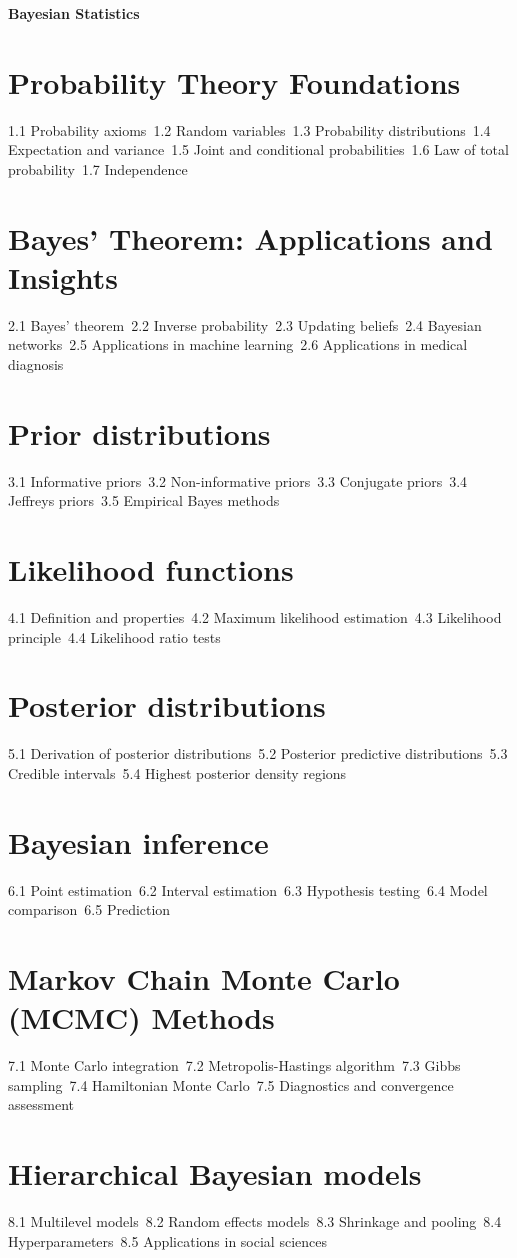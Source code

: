 {\LARGE \bf{Bayesian Statistics}}
\section{Probability Theory Foundations}
1.1 Probability axioms\
1.2 Random variables\
1.3 Probability distributions\
1.4 Expectation and variance\
1.5 Joint and conditional probabilities\
1.6 Law of total probability\
1.7 Independence\
\section{Bayes' Theorem: Applications and Insights}
2.1 Bayes' theorem\
2.2 Inverse probability\
2.3 Updating beliefs\
2.4 Bayesian networks\
2.5 Applications in machine learning\
2.6 Applications in medical diagnosis\
\section{Prior distributions}
3.1 Informative priors\
3.2 Non-informative priors\
3.3 Conjugate priors\
3.4 Jeffreys priors\
3.5 Empirical Bayes methods\
\section{Likelihood functions}
4.1 Definition and properties\
4.2 Maximum likelihood estimation\
4.3 Likelihood principle\
4.4 Likelihood ratio tests\
\section{Posterior distributions}
5.1 Derivation of posterior distributions\
5.2 Posterior predictive distributions\
5.3 Credible intervals\
5.4 Highest posterior density regions\
\section{Bayesian inference}
6.1 Point estimation\
6.2 Interval estimation\
6.3 Hypothesis testing\
6.4 Model comparison\
6.5 Prediction\
\section{Markov Chain Monte Carlo (MCMC) Methods}
7.1 Monte Carlo integration\
7.2 Metropolis-Hastings algorithm\
7.3 Gibbs sampling\
7.4 Hamiltonian Monte Carlo\
7.5 Diagnostics and convergence assessment\
\section{Hierarchical Bayesian models}
8.1 Multilevel models\
8.2 Random effects models\
8.3 Shrinkage and pooling\
8.4 Hyperparameters\
8.5 Applications in social sciences\
